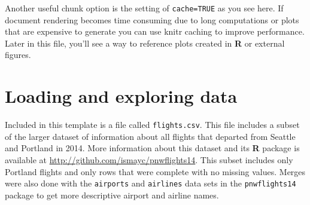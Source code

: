 \documentclass[msc,numbers]{coppe}
\begin{document}
  Another useful chunk option is the setting of \texttt{cache=TRUE} as you see here. If document rendering becomes time consuming due to long computations or plots that are expensive to generate you can use knitr caching to improve performance. Later in this file, you'll see a way to reference plots created in \textbf{R} or external figures.
  
  \hypertarget{loading-and-exploring-data}{%
  \section{Loading and exploring data}\label{loading-and-exploring-data}}
  
  Included in this template is a file called \texttt{flights.csv}. This file includes a subset of the larger dataset of information about all flights that departed from Seattle and Portland in 2014. More information about this dataset and its \textbf{R} package is available at \url{http://github.com/ismayc/pnwflights14}. This subset includes only Portland flights and only rows that were complete with no missing values. Merges were also done with the \texttt{airports} and \texttt{airlines} data sets in the \texttt{pnwflights14} package to get more descriptive airport and airline names.
  
\end{document}
